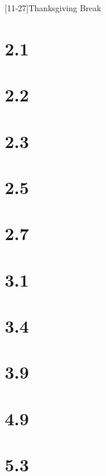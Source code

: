 \documentclass[
	landscape    = true,
	lecture-caps = {1.0},
	quiz-days    = F,
]{schedule}
\begin{document}
\maketitle
\begin{schedule}

	[11-27]{Thanksgiving Break}


	\syllabus
	\section{2.1}          %
	\section{2.2}          %
	\section[2]{2.3}       %
	\section{2.5}          %
	\examreview
	\exam[noquiz]

	\section{2.7}          %
	\section{3.1}          %
	\section[2]{3.4}       %
	\section{3.9}          %
	\examreview
	\exam

	\section{4.9}          %
	\section{5.3}          %
	\finalreview
	\finalsweek[12-14][5]
	\winterbreak

\end{schedule}
\end{document}
